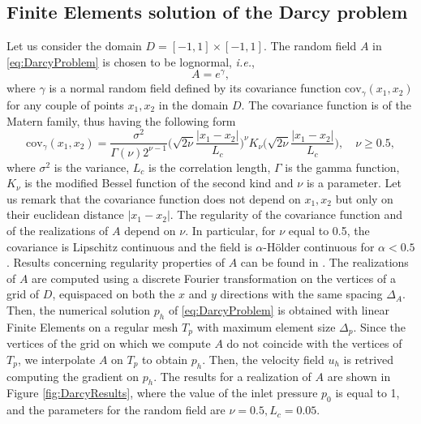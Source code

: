 

\subsection{Finite Elements solution of the Darcy problem}

Let us consider the domain $D = [-1,1] \times [-1,1]$. The random field $A$ in \eqref{eq:DarcyProblem} is chosen to be lognormal, \textit{i.e.}, 
\begin{equation}\label{eq:RandomField}
	A = e^\gamma,
\end{equation}
where $\gamma$ is a normal random field defined by its covariance function $\mathrm{cov}_\gamma(x_1,x_2)$ for any couple of points $x_1,x_2$ in the domain $D$. The covariance function is of the Matern family, thus having the following form
\begin{equation}\label{eq:CovFunction}
	\mathrm{cov}_\gamma(x_1,x_2) = \frac{\sigma^2}{\Gamma(\nu)2^{\nu-1}}\Big(\sqrt{2\nu}\frac{|x_1-x_2|}{L_c}\Big)^\nu K_{\nu}\Big(\sqrt{2\nu}\frac{|x_1-x_2|}{L_c}\Big), \quad \nu \geq 0.5,
\end{equation}
where $\sigma^2$ is the variance, $L_c$ is the correlation length, $\Gamma$ is the gamma function, $K_\nu$ is the modified Bessel function of the second kind and $\nu$ is a parameter. Let us remark that the covariance function does not depend on $x_1, x_2$ but only on their euclidean distance $|x_1 - x_2|$. The regularity of the covariance function and of the realizations of $A$ depend on $\nu$. In particular, for $\nu$ equal to 0.5, the covariance is Lipschitz continuous and the field is $\alpha$-Hölder continuous for $\alpha < 0.5$. Results concerning regularity properties of $A$ can be found in \cite{Nobile2015}. The realizations of $A$ are computed using a discrete Fourier transformation on the vertices of a grid of $D$, equispaced on both the $x$ and $y$ directions with the same spacing $\Delta_A$. Then, the numerical solution $p_h$ of \eqref{eq:DarcyProblem} is obtained with linear Finite Elements on a regular mesh $T_p$ with maximum element size $\Delta_p$. Since the vertices of the grid on which we compute $A$ do not coincide with the vertices of $T_p$, we interpolate $A$ on $T_p$ to obtain $p_h$. Then, the velocity field $u_h$ is retrived computing the gradient on $p_h$. The results for a realization of $A$ are shown in Figure \ref{fig:DarcyResults}, where the value of the inlet pressure $p_0$ is equal to 1, and the parameters for the random field are $\nu = 0.5, L_c = 0.05$. 

